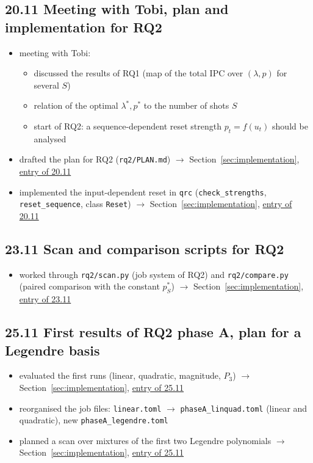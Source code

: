 \subsection*{20.11 \quad Meeting with Tobi, plan and implementation for RQ2}
\begin{itemize}
    \item meeting with Tobi:
    \begin{itemize}
        \item discussed the results of RQ1 (map of the total IPC over $(\lambda, p)$ for several $S$)
        \item relation of the optimal $\lambda^*, p^*$ to the number of shots $S$
        \item start of RQ2: a sequence-dependent reset strength $p_t = f(u_t)$ should be analysed
    \end{itemize}
    \item drafted the plan for RQ2 (\texttt{rq2/PLAN.md}) $\to$ Section~\ref{sec:implementation},
    \hyperref[sec:rq2-plan]{entry of 20.11}
    \item implemented the input-dependent reset in \texttt{qrc} (\texttt{check\_strengths}, \texttt{reset\_sequence},
    class \texttt{Reset}) $\to$ Section~\ref{sec:implementation}, \hyperref[sec:rq2-implementation]{entry of 20.11}
\end{itemize}

\subsection*{23.11 \quad Scan and comparison scripts for RQ2}
\begin{itemize}
    \item worked through \texttt{rq2/scan.py} (job system of RQ2) and \texttt{rq2/compare.py} (paired
    comparison with the constant $p^*_S$) $\to$ Section~\ref{sec:implementation},
    \hyperref[sec:rq2-scan-compare]{entry of 23.11}
\end{itemize}

\subsection*{25.11 \quad First results of RQ2 phase A, plan for a Legendre basis}
\begin{itemize}
    \item evaluated the first runs (linear, quadratic, magnitude, $P_3$) $\to$ Section~\ref{sec:implementation},
    \hyperref[sec:rq2-phaseA-results]{entry of 25.11}
    \item reorganised the job files: \texttt{linear.toml} $\to$ \texttt{phaseA\_linquad.toml} (linear and quadratic),
    new \texttt{phaseA\_legendre.toml}
    \item planned a scan over mixtures of the first two Legendre polynomials $\to$ Section~\ref{sec:implementation},
    \hyperref[sec:rq2-legendre-plan]{entry of 25.11}
\end{itemize}

